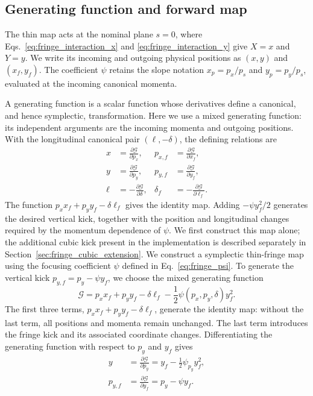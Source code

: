 \subsection{Generating function and forward map}

The thin map acts at the nominal plane $s=0$, where
Eqs.~\eqref{eq:fringe_interaction_x} and \eqref{eq:fringe_interaction_y}
give $X=x$ and $Y=y$. We write its incoming and outgoing physical positions
as $(x,y)$ and $(x_f,y_f)$. The coefficient $\psi$ retains the slope
notation $x_p=p_x/p_s$ and $y_p=p_y/p_s$, evaluated at the incoming
canonical momenta.

A generating function is a scalar function whose derivatives define a
canonical, and hence symplectic, transformation. Here we use a mixed
generating function: its independent arguments are the incoming momenta
and outgoing positions. With the longitudinal canonical pair
$(\ell,-\delta)$, the defining relations are
\begin{align}
 x&=\frac{\partial\mathcal G}{\partial p_x},&
 p_{x,f}&=\frac{\partial\mathcal G}{\partial x_f},\\
 y&=\frac{\partial\mathcal G}{\partial p_y},&
 p_{y,f}&=\frac{\partial\mathcal G}{\partial y_f},\\
 \ell&=-\frac{\partial\mathcal G}{\partial\delta},&
 \delta_f&=-\frac{\partial\mathcal G}{\partial\ell_f}.
\end{align}
The function $p_xx_f+p_yy_f-\delta\ell_f$ gives the identity map.
Adding $-\psi y_f^2/2$ generates the desired vertical kick, together with
the position and longitudinal changes required by the momentum dependence
of $\psi$. We first construct this map alone; the additional cubic kick
present in the implementation is described separately in
Section~\ref{sec:fringe_cubic_extension}.
We construct a symplectic thin-fringe map using the focusing coefficient
$\psi$ defined in Eq.~\eqref{eq:fringe_psi}. To generate the vertical kick
$p_{y,f}=p_y-\psi y_f$, we choose the mixed generating function
\begin{equation}
 \mathcal G=p_xx_f+p_yy_f-\delta\ell_f
             -\frac12\psi(p_x,p_y,\delta)y_f^2.
 \label{eq:fringe_generating_function}
\end{equation}
The first three terms, $p_xx_f+p_yy_f-\delta\ell_f$, generate the identity
map: without the last term, all positions and momenta remain unchanged.
The last term introduces the fringe kick and its associated coordinate changes.
Differentiating the generating function with respect to $p_y$ and $y_f$ gives
\begin{align}
 y&=\frac{\partial\mathcal G}{\partial p_y}
   =y_f-\frac12\psi_{p_y}y_f^2,\\
 p_{y,f}&=\frac{\partial\mathcal G}{\partial y_f}
         =p_y-\psi y_f.
\end{align}
